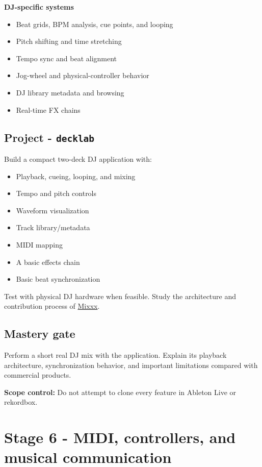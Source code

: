 \documentclass[11pt,letterpaper]{article}
\begin{document}
\textbf{DJ-specific systems}

\begin{itemize}
\item Beat grids, BPM analysis, cue points, and looping
\item Pitch shifting and time stretching
\item Tempo sync and beat alignment
\item Jog-wheel and physical-controller behavior
\item DJ library metadata and browsing
\item Real-time FX chains
\end{itemize}

\subsection*{Project - \texttt{decklab}}\label{project-decklab}

Build a compact two-deck DJ application with:

\begin{itemize}
\item Playback, cueing, looping, and mixing
\item Tempo and pitch controls
\item Waveform visualization
\item Track library/metadata
\item MIDI mapping
\item A basic effects chain
\item Basic beat synchronization
\end{itemize}

Test with physical DJ hardware when feasible. Study the architecture and contribution process of \href{https://github.com/mixxxdj/mixxx}{Mixxx}.

\subsection*{Mastery gate}\label{mastery-gate-5}

Perform a short real DJ mix with the application. Explain its playback architecture, synchronization behavior, and important limitations compared with commercial products.

\textbf{Scope control:} Do not attempt to clone every feature in Ableton Live or rekordbox.

\clearpage

\section{Stage 6 - MIDI, controllers, and musical communication}\label{stage-6-midi-controllers-and-musical-communication}
\end{document}
